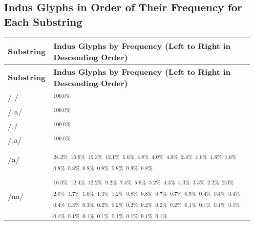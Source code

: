 \documentclass{article}
\begin{document}
\begin{center}
\section*{Indus Glyphs in Order of Their Frequency for Each Substring}
\end{center}
\begin{longtable}{|l|p{}|}
\hline
\textbf{Substring} & \textbf{Indus Glyphs by Frequency (Left to Right in Descending Order)} \\
\hline
\endfirsthead
\hline
\textbf{Substring} & \textbf{Indus Glyphs by Frequency (Left to Right in Descending Order)} \\
\hline
\endhead
\hline
\endfoot
\hline
\endlastfoot
/ / & \textIndus{}$_{100.0\%}$ \\ \hline
/ a/ & \textIndus{}$_{100.0\%}$ \\ \hline
/./ & \textIndus{}$_{100.0\%}$ \\ \hline
/.a/ & \textIndus{}$_{100.0\%}$ \\ \hline
/a/ & \textIndus{}$_{24.2\%}$ \quad \textIndus{}$_{16.9\%}$ \quad \textIndus{}$_{15.3\%}$ \quad \textIndus{}$_{12.1\%}$ \quad \textIndus{}$_{5.6\%}$ \quad \textIndus{}$_{4.8\%}$ \quad \textIndus{}$_{4.0\%}$ \quad \textIndus{}$_{4.0\%}$ \quad \textIndus{}$_{2.4\%}$ \quad \textIndus{}$_{1.6\%}$ \quad \textIndus{}$_{1.6\%}$ \quad \textIndus{}$_{1.6\%}$ \quad \textIndus{}$_{0.8\%}$ \quad \textIndus{}$_{0.8\%}$ \quad \textIndus{}$_{0.8\%}$ \quad \textIndus{}$_{0.8\%}$ \quad \textIndus{}$_{0.8\%}$ \quad \textIndus{}$_{0.8\%}$ \quad \textIndus{}$_{0.8\%}$ \\ \hline
/aa/ & \textIndus{}$_{16.0\%}$ \quad \textIndus{}$_{12.4\%}$ \quad \textIndus{}$_{12.2\%}$ \quad \textIndus{}$_{9.2\%}$ \quad \textIndus{}$_{7.4\%}$ \quad \textIndus{}$_{5.9\%}$ \quad \textIndus{}$_{5.2\%}$ \quad \textIndus{}$_{4.3\%}$ \quad \textIndus{}$_{4.3\%}$ \quad \textIndus{}$_{3.3\%}$ \quad \textIndus{}$_{2.2\%}$ \quad \textIndus{}$_{2.0\%}$ \quad \textIndus{}$_{2.0\%}$ \quad \textIndus{}$_{1.7\%}$ \quad \textIndus{}$_{1.6\%}$ \quad \textIndus{}$_{1.3\%}$ \quad \textIndus{}$_{1.2\%}$ \quad \textIndus{}$_{0.8\%}$ \quad \textIndus{}$_{0.8\%}$ \quad \textIndus{}$_{0.7\%}$ \quad \textIndus{}$_{0.7\%}$ \quad \textIndus{}$_{0.5\%}$ \quad \textIndus{}$_{0.4\%}$ \quad \textIndus{}$_{0.4\%}$ \quad \textIndus{}$_{0.4\%}$ \quad \textIndus{}$_{0.4\%}$ \quad \textIndus{}$_{0.3\%}$ \quad \textIndus{}$_{0.3\%}$ \quad \textIndus{}$_{0.2\%}$ \quad \textIndus{}$_{0.2\%}$ \quad \textIndus{}$_{0.2\%}$ \quad \textIndus{}$_{0.2\%}$ \quad \textIndus{}$_{0.2\%}$ \quad \textIndus{}$_{0.2\%}$ \quad \textIndus{}$_{0.1\%}$ \quad \textIndus{}$_{0.1\%}$ \quad \textIndus{}$_{0.1\%}$ \quad \textIndus{}$_{0.1\%}$ \quad \textIndus{}$_{0.1\%}$ \quad \textIndus{}$_{0.1\%}$ \quad \textIndus{}$_{0.1\%}$ \quad \textIndus{}$_{0.1\%}$ \quad \textIndus{}$_{0.1\%}$ \quad \textIndus{}$_{0.1\%}$ \quad \textIndus{}$_{0.1\%}$ \quad \textIndus{}$_{0.1\%}$ \\ \hline

\end{longtable}
\end{document}
